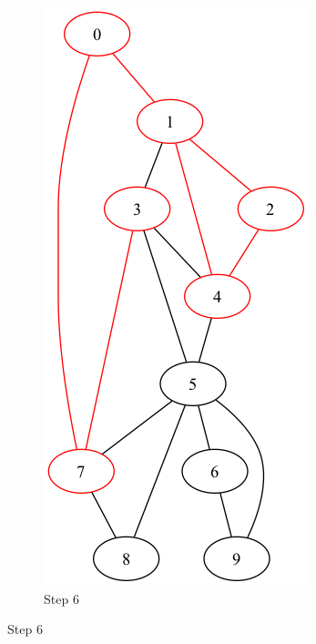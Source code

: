 \documentclass[a4paper,11pt]{report}
\begin{document}
\begin{figure}[htbp]
\begin{subfigure}[b]{0.3\textwidth}
        \includegraphics[height=0.29\textheight]{notebook/assets/aufgabe_07_fleury_step_5.png}
        \caption{Step 6}
        \label{fig:fleury_step_6}
    \end{subfigure}
    
    \vspace{1em}
    

\end{figure}
\end{document}

